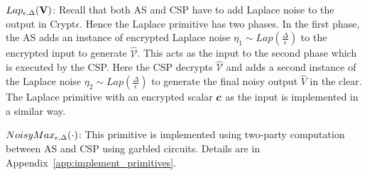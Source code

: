 $Lap_{\epsilon,\Delta}(\mathbf{V})$:  Recall that both \textsf{AS} and \textsf{CSP} have to add Laplace noise to the output in Crypt$\epsilon$. Hence the \textsf{Laplace} primitive  has two phases. In the first phase,  the \textsf{AS} adds an instance of encrypted Laplace noise $\eta_1 \sim Lap(\frac{\Delta}{\epsilon})$ to the encrypted input  to generate $\mathbf{\hat{\mathcal{V}}}$. This acts as the input to the second phase which is executed by the \textsf{CSP}. Here the \textsf{CSP} decrypts $\mathbf{\hat{\mathcal{V}}}$ and adds a second instance of the Laplace noise $\eta_2 \sim Lap(\frac{\Delta}{\epsilon})$ to generate the final noisy output $\hat{V}$ in the clear. %
The \textsf{Laplace} primitive with an encrypted scalar $\boldsymbol{c}$ as the input is implemented in a similar way.

 $NoisyMax_{\epsilon,\Delta}(\cdot)$: This primitive is implemented using two-party computation between \textsf{AS} and \textsf{CSP} using garbled circuits. Details are in  Appendix~\ref{app:implement_primitives}.


